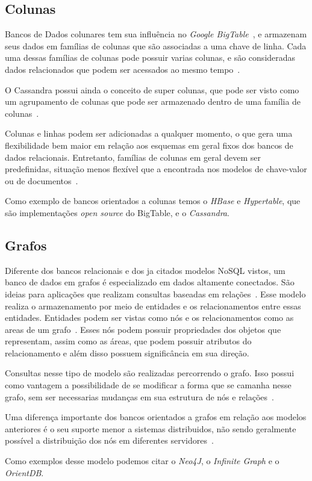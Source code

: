 \subsection*{Colunas}
Bancos de Dados colunares tem sua influência no \emph{Google BigTable}~\cite{bigtable}, e armazenam seus dados em famílias de colunas que são associadas a uma chave de linha. Cada uma dessas famílias de colunas pode possuir varias colunas, e são consideradas dados relacionados que podem ser acessados ao mesmo tempo~\cite{pramod}. 

O Cassandra possui ainda o conceito de super colunas, que pode ser visto como um agrupamento de colunas que pode ser armazenado dentro de uma família de colunas~\cite{pramod}.

Colunas e linhas podem ser adicionadas a qualquer momento, o que gera uma flexibilidade bem maior em relação aos esquemas em geral fixos dos bancos de dados relacionais.  Entretanto, famílias de colunas em geral devem ser predefinidas, situação menos flexível que a encontrada nos modelos de chave-valor ou de documentos~\cite{nosqleval}.  

Como exemplo de bancos orientados a colunas temos o \emph{HBase} e \emph{Hypertable}, que são implementações \emph{open source} do BigTable, e o \emph{Cassandra}.


\subsection*{Grafos}
Diferente dos bancos relacionais e dos ja citados modelos NoSQL vistos, um banco de dados em grafos é especializado em dados altamente conectados. São ideias para aplicações que realizam consultas baseadas em relações~\cite{nosqleval}.
Esse modelo realiza o armazenamento por meio de entidades e os relacionamentos entre essas entidades. Entidades podem ser vistas como nós e os relacionamentos como as areas de um grafo~\cite{pramod}. Esses nós podem possuir propriedades dos objetos que representam, assim como as áreas, que podem possuir atributos do relacionamento e além disso possuem significância em sua direção.

Consultas nesse tipo de modelo são realizadas percorrendo o grafo. Isso possui como vantagem a possibilidade de se modificar a forma que se camanha nesse grafo, sem ser necessarias mudanças em sua estrutura de nós e relações~\cite{pramod}.

Uma diferença importante dos bancos orientados a grafos em relação aos modelos anteriores é o seu suporte menor a sistemas distribuidos, não sendo geralmente possível a distribuição dos nós em diferentes servidores~\cite{pramod}.

Como exemplos desse modelo podemos citar o \emph{Neo4J}, o \emph{Infinite Graph} e o \emph{OrientDB}.